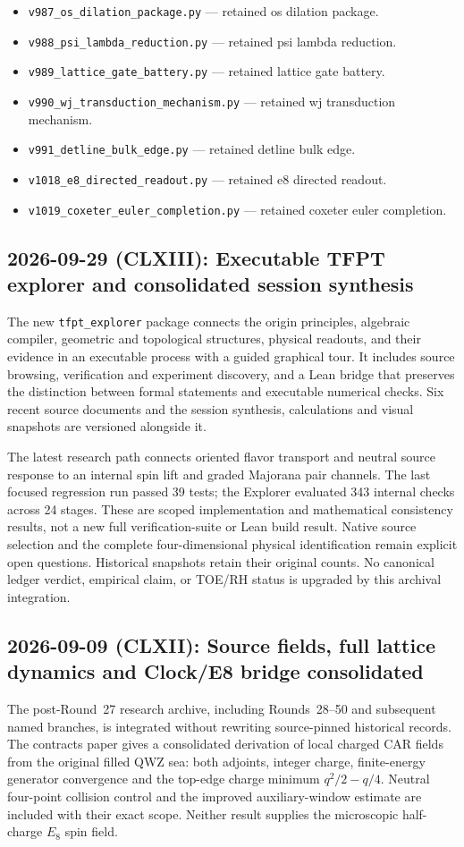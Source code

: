 \begin{itemize}[leftmargin=2em,itemsep=1pt]
\item \texttt{v987\_os\_dilation\_package.py} --- retained os dilation package.
\item \texttt{v988\_psi\_lambda\_reduction.py} --- retained psi lambda reduction.
\item \texttt{v989\_lattice\_gate\_battery.py} --- retained lattice gate battery.
\item \texttt{v990\_wj\_transduction\_mechanism.py} --- retained wj transduction mechanism.
\item \texttt{v991\_detline\_bulk\_edge.py} --- retained detline bulk edge.
\item \texttt{v1018\_e8\_directed\_readout.py} --- retained e8 directed readout.
\item \texttt{v1019\_coxeter\_euler\_completion.py} --- retained coxeter euler completion.
\end{itemize}

\subsection*{2026-09-29 (CLXIII): Executable TFPT explorer and consolidated session synthesis}
The new \texttt{tfpt\_explorer} package connects the origin principles,
algebraic compiler, geometric and topological structures, physical readouts,
and their evidence in an executable process with a guided graphical tour.
It includes source browsing, verification and experiment discovery, and a
Lean bridge that preserves the distinction between formal statements and
executable numerical checks. Six recent source documents and the session
synthesis, calculations and visual snapshots are versioned alongside it.

The latest research path connects oriented flavor transport and neutral
source response to an internal spin lift and graded Majorana pair channels.
The last focused regression run passed 39 tests; the Explorer evaluated
343 internal checks across 24 stages. These are scoped implementation and
mathematical consistency results, not a new full verification-suite or
Lean build result. Native source selection and the complete four-dimensional
physical identification remain explicit open questions. Historical snapshots
retain their original counts. No canonical ledger verdict, empirical claim,
or TOE/RH status is upgraded by this archival integration.

\subsection*{2026-09-09 (CLXII): Source fields, full lattice dynamics and Clock/E8 bridge consolidated}
The post-Round~27 research archive, including Rounds~28--50 and subsequent
named branches, is integrated without rewriting source-pinned historical
records. The contracts paper gives a consolidated derivation of local
charged CAR fields from the original filled QWZ sea: both adjoints,
integer charge, finite-energy generator convergence and the top-edge
charge minimum $q^2/2-q/4$. Neutral four-point collision control and the
improved auxiliary-window estimate are included with their exact scope.
Neither result supplies the microscopic half-charge $E_8$ spin field.

